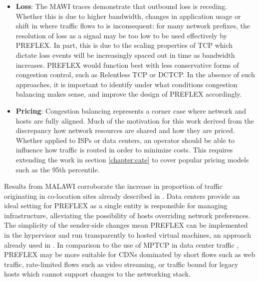 \begin{itemize}
\item{
    \textbf{Loss}: The \ac{MAWI} traces demonstrate that outbound loss is receding.
    Whether this is due to higher bandwidth, changes in application usage or shift in where traffic flows to is inconsequent: for many network prefixes, the resolution of loss as a signal may be too low to be used effectively by \ac{PREFLEX}.
    In part, this is due to the scaling properties of \ac{TCP} which dictate loss events will be increasingly spaced out in time as bandwidth increases.
    \ac{PREFLEX} would function best with less conservative forms of congestion control, such as Relentless \ac{TCP} or \ac{DCTCP}.
    In the absence of such approaches, it is important to identify under what conditions congestion balancing makes sense, and improve the design of \ac{PREFLEX} accordingly.
}

\item{
    \textbf{Pricing}: Congestion balancing represents a corner case where network and hosts are fully aligned. 
    Much of the motivation for this work derived from the discrepancy how network resources are shared and how they are priced.
    Whether applied to \acp{ISP} or data centers, an operator should be able to influence how traffic is routed in order to minimize costs.
    This requires extending the work in section \ref{chapter:cate} to cover popular pricing models such as the 95th percentile.
}
\end{itemize}

Results from \ac{MALAWI} corroborate the increase in proportion of traffic originating in co-location sites already described in \cite{Labovitz:2010p175}.
Data centers provide an ideal setting for \ac{PREFLEX} as a single entity is responsible for managing infrastructure, alleviating the possibility of hosts overriding network preferences.
The simplicity of the sender-side changes mean \ac{PREFLEX} can be implemented in the hypervisor and run transparently to hosted virtual machines, an approach already used in \cite{Wu:2010p556}.
In comparison to the use of \ac{MPTCP} in data center traffic \cite{Raiciu:2011p539}, \ac{PREFLEX} may be more suitable for \acp{CDN} dominated by short flows such as web traffic, rate-limited flows such as video streaming, or traffic bound for legacy hosts which cannot support changes to the networking stack.



